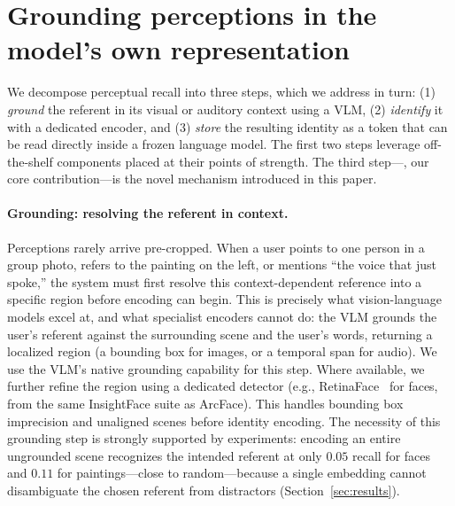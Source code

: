\section{Grounding perceptions in the model's own representation}
\label{sec:method}

We decompose perceptual recall into three steps, which we address in turn: (1) \emph{ground} the referent in its visual or auditory context using a VLM, (2) \emph{identify} it with a dedicated encoder, and (3) \emph{store} the resulting identity as a token that can be read directly inside a frozen language model. The first two steps leverage off-the-shelf components placed at their points of strength. The third step---\attmem{}, our core contribution---is the novel mechanism introduced in this paper.

\paragraph{Grounding: resolving the referent in context.} Perceptions rarely arrive pre-cropped. When a user points to one person in a group photo, refers to the painting on the left, or mentions ``the voice that just spoke,'' the system must first resolve this context-dependent reference into a specific region before encoding can begin. This is precisely what vision-language models excel at, and what specialist encoders cannot do: the VLM grounds the user's referent against the surrounding scene and the user's words, returning a localized region (a bounding box for images, or a temporal span for audio). We use the VLM's native grounding capability for this step. Where available, we further refine the region using a dedicated detector (e.g., RetinaFace~\citep{retinaface} for faces, from the same InsightFace suite as ArcFace). This handles bounding box imprecision and unaligned scenes before identity encoding. The necessity of this grounding step is strongly supported by experiments: encoding an entire ungrounded scene recognizes the intended referent at only $0.05$ recall for faces and $0.11$ for paintings---close to random---because a single embedding cannot disambiguate the chosen referent from distractors (Section~\ref{sec:results}).

